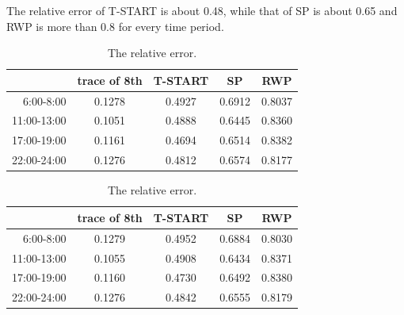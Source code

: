 The relative error of T-START is about 0.48, while that of SP is about 0.65 and RWP is more than 0.8 for every time period.  
\begin{table}[!h]
\caption{The relative error.}\label{table_relative_err}
\centering
\begin{tabular}{r|c|c|c|c}
\hline
	&trace of 8th	&T-START &SP &RWP\\
\hline
 6:00-8:00&
0.1278&	0.4927&	0.6912&	0.8037\\ 
 11:00-13:00&
0.1051&	0.4888&	0.6445&	0.8360\\
 17:00-19:00&
0.1161&	0.4694&	0.6514&	0.8382\\
 22:00-24:00&
0.1276&	0.4812&	0.6574&	0.8177\\
\hline
\end{tabular}
\begin{tabular}{r|c|c|c|c}
\hline
	&trace of 8th	&T-START &SP&RWP\\
\hline
 6:00-8:00&
0.1279&	0.4952&	0.6884&	0.8030\\
 11:00-13:00&
0.1055&	0.4908&	0.6434&	0.8371\\
 17:00-19:00&
0.1160&	0.4730&	0.6492&	0.8380\\
 22:00-24:00&
0.1276&	0.4842&	0.6555&	0.8179\\
\hline
\end{tabular}
\end{table}
